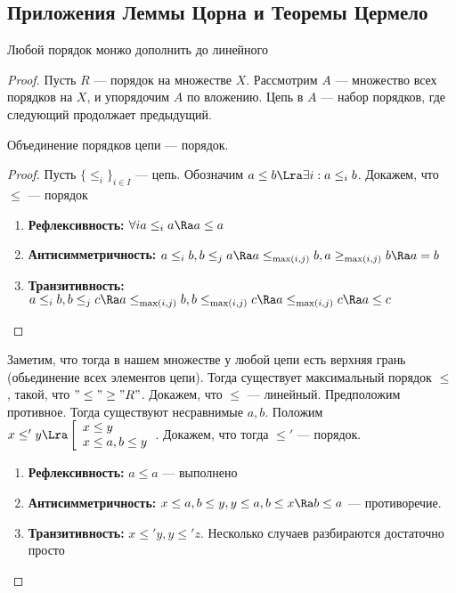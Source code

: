 \subsection{Приложения Леммы Цорна и Теоремы Цермело}

\begin{theorem}
    Любой порядок монжо дополнить до линейного
\end{theorem}
\begin{proof}
    Пусть \(R\) --- порядок на множестве \(X\). Рассмотрим \(A\) --- множество всех порядков на \(X\), и упорядочим \(A\) по вложению. Цепь в \(A\) --- набор порядков, где следующий продолжает предыдущий.
    \begin{proposition}
        Объединение порядков цепи --- порядок.
    \end{proposition}
    \begin{proof}
        Пусть \(\{\le_i\}_{i \in I}\) --- цепь. Обозначим \(a \le b \Lra \exists i: a\le_i b\). Докажем, что \(\le\) --- порядок
        \begin{enumerate}
            \item[] \textbf{Рефлексивность:} \(\forall i a \le_i a \Ra a \le a\)
            \item[] \textbf{Антисимметричность:} \(a \le_i b, b \le_j a \Ra a \le_{\max(i, j)} b, a \ge_{\max(i, j)} b \Ra a = b\)
            \item[] \textbf{Транзитивность:} \(a \le_i b, b \le_j c \Ra a \le_{\max(i, j)} b, b \le_{\max(i, j)} c \Ra a \le_{\max(i, j)} c \Ra a \le c\)
        \end{enumerate}
    \end{proof}
    Заметим, что тогда в нашем множестве у любой цепи есть верхняя грань (обьединение всех элементов цепи). Тогда существует максимальный порядок \(\le\), такой, что \("\le" \ge "R"\). Докажем, что \(\le\) --- линейный. Предположим противное. Тогда существуют несравнимые \(a, b\). Положим \(x \le' y \Lra \left[ \begin{array}{l}
        x \le y \\
        x \le a, b \le y \\
    \end{array}\right.\).
    Докажем, что тогда \(\le'\) --- порядок.
    \begin{enumerate}
        \item[] \textbf{Рефлексивность:} \(a \le a\) --- выполнено
        \item[] \textbf{Антисимметричность:} \(x \le a, b \le y, y \le a, b \le x \Ra b \le a\) --- противоречие.
        \item[] \textbf{Транзитивность:} \(x \le' y, y \le' z\). Несколько случаев разбираются достаточно просто
    \end{enumerate}
\end{proof}

